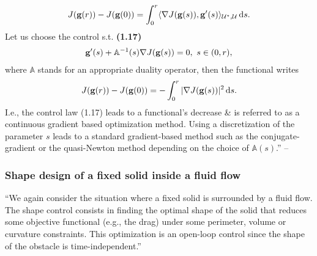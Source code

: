 \documentclass[oneside]{book}
\numberwithin{equation}{section}
\begin{document}
\begin{align*}
	J({\bf g}(r)) - J({\bf g}(0)) = \int_0^r \langle\nabla J({\bf g}(s)),{\bf g}'(s)\rangle_{\mathcal{U}^\star,\mathcal{U}}\,{\rm d}s.
\end{align*}
Let us choose the control s.t. \textbf{(1.17)}
\begin{align*}
	{\bf g}'(s) + \mathbb{A}^{-1}(s)\nabla J({\bf g}(s)) = 0,\ s\in(0,r),
\end{align*}
where $\mathbb{A}$ stands for an appropriate duality operator, then the functional writes
\begin{align*}
	J({\bf g}(r)) - J({\bf g}(0)) = -\int_0^r |\nabla J({\bf g}(s))|^2\,{\rm d}s.
\end{align*}
I.e., the control law (1.17) leads to a functional's decrease \& is referred to as a continuous gradient based optimization method. Using a discretization of the parameter $s$ leads to a standard gradient-based method such as the conjugate-gradient or the quasi-Newton method depending on the choice of $\mathbb{A}(s)$.'' -- \cite[Chap. 1, Subsect. 1.4.1, pp. 11--12]{Moubachir_Zolesio2006}

\subsubsection{Shape design of a fixed solid inside a fluid flow}
``We again consider the situation where a fixed solid is surrounded by a fluid flow. The shape control consists in finding the optimal shape of the solid that reduces some objective functional (e.g., the drag) under some perimeter, volume or curvature constraints. This optimization is an open-loop control since the shape of the obstacle is time-independent.''
\end{document}
